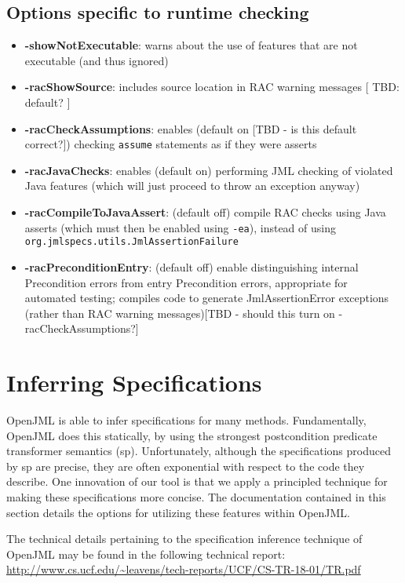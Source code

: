 \subsection{Options specific to runtime checking}
\begin{itemize}[noitemsep,nolistsep]
\item \textbf{-showNotExecutable}: warns about the use of features that are not executable (and thus ignored)
\item \textbf{-racShowSource}: includes source location in RAC warning messages [ TBD: default? ]
\item \textbf{-racCheckAssumptions}: enables (default on [TBD - is this default correct?]) checking \texttt{assume} statements as if they were asserts
\item \textbf{-racJavaChecks}: enables (default on) performing JML checking of violated Java features (which will just proceed to throw an exception anyway)
\item \textbf{-racCompileToJavaAssert}: (default off) compile RAC checks using Java asserts (which must then be enabled using \texttt{-ea}), instead of using \texttt{org.jmlspecs.utils.JmlAssertionFailure}
\item \textbf{-racPreconditionEntry}: (default off) enable distinguishing internal Precondition errors from entry Precondition errors, appropriate for automated testing; compiles code to generate JmlAssertionError exceptions
(rather than RAC warning messages)[TBD - should this turn on -racCheckAssumptions?] 
\end{itemize}

\section{Inferring Specifications}
\label{sec:inferring-specifications}

OpenJML is able to infer specifications for many methods. Fundamentally, OpenJML does this statically, by using the strongest postcondition predicate transformer semantics (sp). Unfortunately, although the specifications produced by sp are precise, they are often exponential with respect to the code they describe. One innovation of our tool is that we apply a principled technique for making these specifications more concise. The documentation contained in this section details the options for utilizing these features within OpenJML. 

The technical details pertaining to the specification inference technique of OpenJML may be found in the following technical report: \url{http://www.cs.ucf.edu/~leavens/tech-reports/UCF/CS-TR-18-01/TR.pdf}


